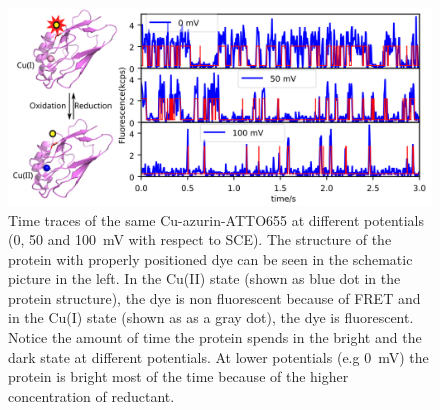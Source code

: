 \begin{figure}
	\centering
	\includegraphics[width=\textwidth]{Figure_1_timetrace_CuAzu}
	\caption{Time traces of the same Cu-azurin-ATTO655 at different potentials (0, 50 and \SI{100}{\mV} with respect to SCE).
	The structure of the protein with properly positioned dye can be seen in the schematic picture in the left.
	In the Cu(II) state (shown as blue dot in the protein structure), the dye is non fluorescent because of FRET and in the Cu(I) state (shown as as a gray dot), the dye is fluorescent. Notice the amount of time the protein spends in the bright and the dark state at different potentials.
	At lower potentials (e.g \SI{0}{\mV}) the protein is bright most of the time because of the higher concentration of reductant.}
	\label{fig:timetrace}
\end{figure}

